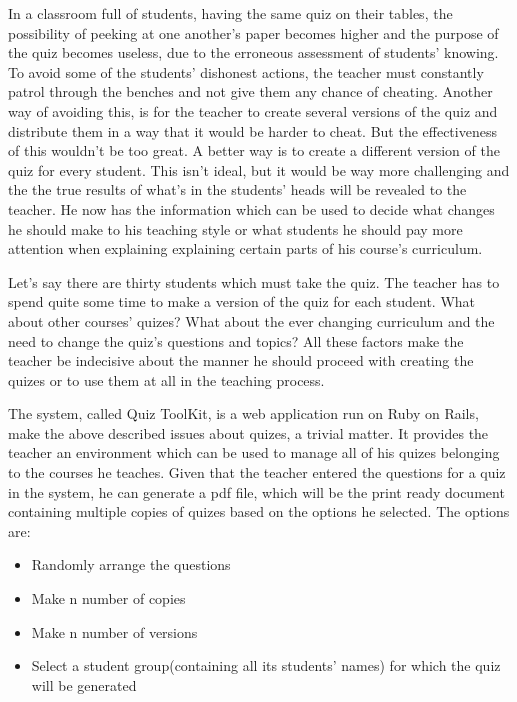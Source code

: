 In a classroom full of students, having the same quiz on their tables, the possibility of peeking at one another’s paper becomes higher and the purpose of the quiz becomes useless, due to the erroneous assessment of students’ knowing. To avoid some of the students’ dishonest actions, the teacher must constantly patrol through the benches and not give them any chance of cheating. Another way of avoiding this, is for the teacher to create several versions of the quiz and distribute them in a way that it would be harder to cheat. But the effectiveness of this wouldn’t be too great. A better way is to create a different version of the quiz for every student. This isn’t ideal, but it would be way more challenging and the the true results of what’s in the students’ heads will be revealed to the teacher. He now has the information which can be used to decide what changes he should make to his teaching style or what students he should pay more attention when explaining  explaining certain parts of his course’s curriculum. 

Let’s say there are thirty students which must take the quiz. The teacher has to spend quite some time to make a version of the quiz for each student. What about other courses’ quizes? What about the ever changing curriculum and the need to change the quiz’s questions and topics? All these factors make the teacher be indecisive about the manner he should proceed with creating the quizes or to use them at all in the teaching process. 



The system, called Quiz ToolKit, is a web application run on Ruby on Rails, make the above described issues about quizes, a trivial matter. It provides the teacher an environment which can be used to manage all of his quizes belonging to the courses he teaches. Given that the teacher entered the questions for a quiz in the system, he can generate a pdf file, which will be the print ready document containing multiple copies of quizes based on the options he selected. The options are: 

\begin{itemize}
  \item Randomly arrange the questions
  \item Make n number of copies
  \item Make n number of versions
  \item Select a student group(containing all its students’ names) for which the quiz will be generated    
\end{itemize}

